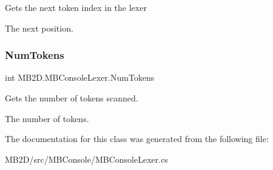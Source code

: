 Gets the next token index in the lexer 

The next position.\hypertarget{class_m_b2_d_1_1_m_b_console_lexer_ae91f360dd9246d226468c79f7322413f}{}\label{class_m_b2_d_1_1_m_b_console_lexer_ae91f360dd9246d226468c79f7322413f} 
\subsubsection{\texorpdfstring{Num\+Tokens}{NumTokens}}
{\footnotesize\ttfamily int M\+B2\+D.\+M\+B\+Console\+Lexer.\+Num\+Tokens\hspace{0.3cm}{\ttfamily [get]}}



Gets the number of tokens scanned. 

The number of tokens.

The documentation for this class was generated from the following file\+:\begin{DoxyCompactItemize}
\item 
M\+B2\+D/src/\+M\+B\+Console/M\+B\+Console\+Lexer.\+cs\end{DoxyCompactItemize}
